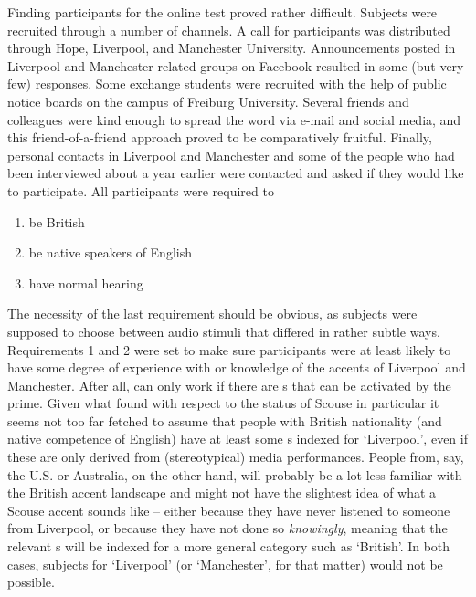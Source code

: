Finding participants for the online test proved rather difficult.
Subjects were recruited through a number of channels.
A call for participants was distributed through Hope, Liverpool, and Manchester University.
Announcements posted in Liverpool and Manchester related groups on Facebook resulted in some (but very few) responses.
Some exchange students were recruited with the help of public notice boards on the campus of Freiburg University.
Several friends and colleagues were kind enough to spread the word via e-mail and social media, and this friend-of-a-friend approach proved to be comparatively fruitful.
Finally, personal contacts in Liverpool and Manchester and some of the people who had been interviewed about a year earlier were contacted and asked if they would like to participate.
All participants were required to\newpage 
\begin{enumerate}
	\item be British
	\item be native speakers of English
	\item have normal hearing
\end{enumerate}
The necessity of the last requirement should be obvious, as subjects were supposed to choose between audio stimuli that differed in rather subtle ways.
Requirements 1 and 2 were set to make sure participants were at least likely to have some degree of experience with or knowledge of the accents of Liverpool and Manchester.
After all,   can only work if there are s that can be activated by the prime.
Given what \textcite{montgomery2007} found with respect to the status of Scouse in particular it seems not too far fetched to assume that people with British nationality (and native competence of English) have at least some s indexed for `Liverpool', even if these are only derived from (stereotypical) media performances.
People from, say, the U.S. or Australia, on the other hand, will probably be a lot less familiar with the British accent landscape and might not have the slightest idea of what a Scouse accent sounds like -- either because they have never listened to someone from Liverpool, or because they have not done so \emph{knowingly}, meaning that the relevant s will be indexed for a more general category such as `British'.
In both cases,  subjects for `Liverpool' (or `Manchester', for that matter) would not be possible.

